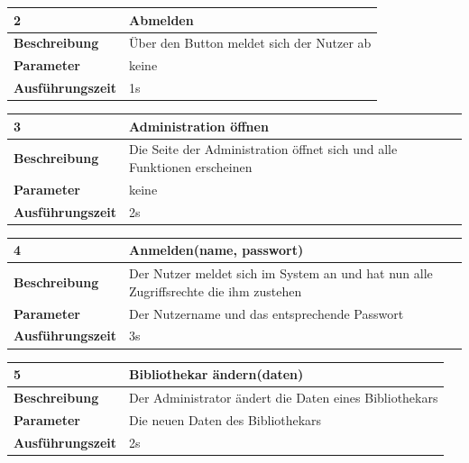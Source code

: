 \documentclass[fontsize=12pt,paper=a4,twoside]{scrartcl}
\begin{document}
  \begin{table}[htbp]
  \label{a2}
  \begin{tabular}{|l|p{10cm}|}
  \hline 
  \textbf{2} & \textbf{Abmelden} \\ \hline
  \textbf{Beschreibung} & Über den Button meldet sich der Nutzer ab\\ \hline
  \textbf{Parameter} & keine \\ \hline
  \textbf{Ausführungszeit} & 1s\\ \hline
  \end{tabular}
  \end{table}
  
  \begin{table}[htbp]
  \label{a3}
  \begin{tabular}{|l|p{10cm}|}
  \hline 
  \textbf{3} & \textbf{Administration öffnen} \\ \hline
  \textbf{Beschreibung} & Die Seite der Administration öffnet sich und alle Funktionen erscheinen\\ \hline
  \textbf{Parameter} & keine \\ \hline
  \textbf{Ausführungszeit} & 2s\\ \hline
  \end{tabular}
  \end{table}
  
  \begin{table}[htbp]
  \label{a4}
  \begin{tabular}{|l|p{10cm}|}
  \hline 
  \textbf{4} & \textbf{Anmelden(name, passwort)} \\ \hline
  \textbf{Beschreibung} & Der Nutzer meldet sich im System an und hat nun alle Zugriffsrechte die ihm zustehen\\ \hline
  \textbf{Parameter} & Der Nutzername und das entsprechende Passwort \\ \hline
  \textbf{Ausführungszeit} & 3s\\ \hline
  \end{tabular}
  \end{table}
  
    \begin{table}[htbp]
    \label{a5}
    \begin{tabular}{|l|p{10cm}|}
    \hline 
    \textbf{5} & \textbf{Bibliothekar ändern(daten)} \\ \hline
    \textbf{Beschreibung} & Der Administrator ändert die Daten eines Bibliothekars\\ \hline
    \textbf{Parameter} & Die neuen Daten des Bibliothekars \\ \hline
    \textbf{Ausführungszeit} & 2s\\ \hline
    \end{tabular}
    \end{table}
  
\end{document}
